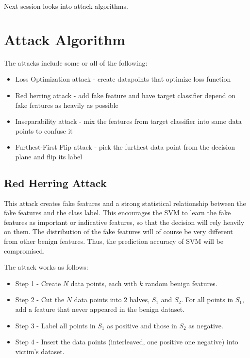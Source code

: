 \documentclass[10pt,conference,compsocconf,letterpaper]{IEEEtran}
\begin{document}
Next session looks into attack algorithms.


\section{Attack Algorithm}

The attacks include some or all of the following:

\begin{itemize}
\item Loss Optimization attack - create datapoints that optimize loss function \cite{biggio12}
\item Red herring attack - add fake feature and have target classifier depend on fake features as heavily as possible \cite{newsome06}
\item Inseparability attack - mix the features from target classifier into same data points to confuse it \cite{newsome06}
\item Furthest-First Flip attack - pick the furthest data point from the decision plane and flip its label \cite{xiao12}
\end{itemize}

\subsection{Red Herring Attack}

This attack creates fake features and a strong statistical relationship between the fake features and the class label. This encourages the SVM to learn the fake features as important or indicative features, so that the decision will rely heavily on them. The distribution of the fake features will of course be very different from other benign features. Thus, the prediction accuracy of SVM will be compromised.

The attack works as follows:

\begin{itemize}
\item Step 1 - Create $N$ data points, each with $k$ random benign features.
\item Step 2 - Cut the $N$ data points into 2 halves, $S_1$ and $S_2$. For all points in $S_1$, add a feature that never appeared in the benign dataset.
\item Step 3 - Label all points in $S_1$ as positive and those in $S_2$ as negative.
\item Step 4 - Insert the data points (interleaved, one positive one negative) into victim's dataset.
\end{itemize}
\end{document}
